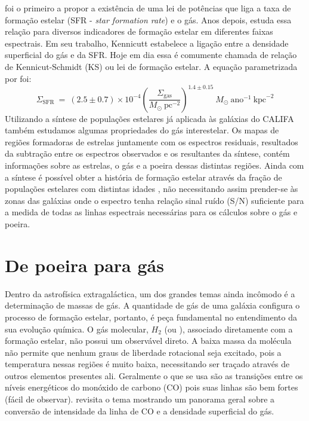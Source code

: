 \citet{Schmidt.1959a} foi o primeiro a propor a existência de uma lei de potências que liga a taxa
de formação estelar (SFR - {\em star formation rate}) e o gás. Anos depois, \citet{Kennicutt.1998a}
estuda essa relação para diversos indicadores de formação estelar em diferentes faixas espectrais.
Em seu trabalho, Kennicutt estabelece a ligação entre a densidade superficial do gás e da SFR. Hoje
em dia essa é comumente chamada de relação de Kennicut-Schmidt (KS) ou lei de formação estelar. A
equação parametrizada por \citeauthor{Kennicutt.1998a} foi:
\begin{equation}
	\Sigma_{\mathrm{SFR}}\ =\ (2.5\pm0.7)\times 10^{-4} \left(\frac{\Sigma_{\mathrm{gas}}}{
M_\odot\ \mathrm{pc}^{-2}}\right)^{1.4 \pm 0.15}\ M_\odot\ \mathrm{ano}^{-1}\ \mathrm{kpc}^{-2}
\end{equation}
\noindent Utilizando a síntese de populações estelares já aplicada às galáxias do CALIFA também
estudamos algumas propriedades do gás interestelar. Os mapas de regiões formadoras de estrelas
juntamente com os espectros residuais, resultados da subtração entre os espectros observados e os
resultantes da síntese, contém informações sobre as estrelas, o gás e a poeira dessas distintas
regiões. Ainda com a síntese é possível obter a história de formação estelar através da fração de
populações estelares com distintas idades \citep{Asari.etal.2007a}, não necessitando assim
prender-se às zonas das galáxias onde o espectro tenha relação sinal ruído (S/N) suficiente para a
medida de todas as linhas espectrais necessárias para os cálculos sobre o gás e poeira.

\section{De poeira para gás}
\label{sec:intro:dust2gas}

Dentro da astrofísica extragaláctica, um dos grandes temas ainda incômodo é a determinação de
massas de gás. A quantidade de gás de uma galáxia configura o processo de formação estelar,
portanto, é peça fundamental no entendimento da sua evolução química. O gás molecular, $H_2$ (ou
\Hii), associado diretamente com a formação estelar, não possui um observável direto. A baixa massa
da molécula \Hii não permite que nenhum graus de liberdade rotacional seja excitado, pois a
temperatura nessas regiões é muito baixa, necessitando ser traçado através de outros elementos
presentes ali. Geralmente o que se usa são as transições entre os níveis energéticos do monóxido de
carbono (CO) pois suas linhas são bem fortes (fácil de observar). \citep{Bolatto.etal.2013a}
revisita o tema mostrando um panorama geral sobre a conversão de intensidade da linha de CO e a
densidade superficial do gás.

